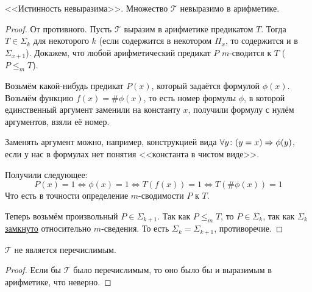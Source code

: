 \begin{theorem}[Тарского]
	<<Истинность невыразима>>.
	Множество $\mathcal{T}$ невыразимо в арифметике.
\end{theorem}
\begin{proof}
	От противного.
	Пусть $\mathcal{T}$ выразим в арифметике предикатом $T$.
	Тогда $T \in \Sigma_k$ для некоторого $k$ (если содержится в некотором $\Pi_{x}$, то содержится и в $\Sigma_{x+1}$).
	Докажем, что любой арифметический предикат $P$ $m$-сводится к $T$ ($P \le_m T$).

	Возьмём какой-нибудь предикат $P(x)$, который задаётся формулой $\phi(x)$.
	Возьмём функцию $f(x) = \# \phi(x)$, то есть номер формулы $\phi$, в которой единственный аргумент заменили
	на константу $x$, получили формулу с нулём аргументов, взяли её номер.
	\begin{Rem}
	Заменять аргумент можно, например, конструкцией вида $\forall y \colon (y=x) \Rightarrow \phi(y)$, если
	у нас в формулах нет понятия <<константа в чистом виде>>.
	\end{Rem}
	Получили следующее:
	\[ P(x) = 1 \iff \phi(x) = 1 \iff T(f(x)) = 1 \iff T(\# \phi(x)) = 1 \]
	Что есть в точности определение $m$-сводимости $P$ к $T$.
	
	Теперь возьмём произвольный $P \in \Sigma_{k+1}$.
	Так как $P \le_m T$, то $P \in \Sigma_k$, так как $\Sigma_k$ \hyperref[mReducibleInvariant]{замкнуто} относительно $m$-сведения.
	То есть $\Sigma_k = \Sigma_{k+1}$, противоречие.
\end{proof}

\begin{conseq}
	$\mathcal{T}$ не является перечислимым.
\end{conseq}
\begin{proof}
	Если бы $\mathcal{T}$ было перечислимым, то оно было бы и выразимым в арифметике, что неверно.
\end{proof}

